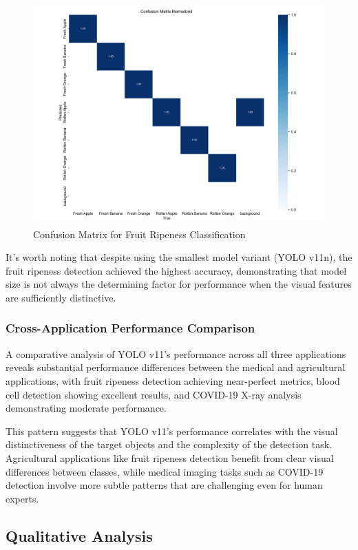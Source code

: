 \begin{multicols}{2}
\begin{figure}[h]
\centering
\includegraphics[width=0.9\columnwidth]{../datas/agriculture/confusion_matrix_normalized.png}
\caption{Confusion Matrix for Fruit Ripeness Classification}
\label{fig:fruit_confusion}
\end{figure}

It's worth noting that despite using the smallest model variant (YOLO v11n), the fruit ripeness detection achieved the highest accuracy, demonstrating that model size is not always the determining factor for performance when the visual features are sufficiently distinctive.

\subsubsection{Cross-Application Performance Comparison}

A comparative analysis of YOLO v11's performance across all three applications reveals substantial performance differences between the medical and agricultural applications, with fruit ripeness detection achieving near-perfect metrics, blood cell detection showing excellent results, and COVID-19 X-ray analysis demonstrating moderate performance.

This pattern suggests that YOLO v11's performance correlates with the visual distinctiveness of the target objects and the complexity of the detection task. Agricultural applications like fruit ripeness detection benefit from clear visual differences between classes, while medical imaging tasks such as COVID-19 detection involve more subtle patterns that are challenging even for human experts.

\subsection{Qualitative Analysis}


\end{multicols}
